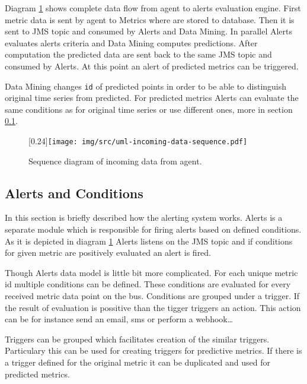     Diagram \ref{img:sequence-incoming-data} shows complete data flow from agent to alerts evaluation engine.
    First metric data is sent by agent to Metrics where are stored to database. Then it is sent to JMS topic
    and consumed by Alerts and Data Mining. In parallel Alerts evaluates alerts criteria and Data Mining computes
    predictions. After computation the predicted data are sent back to the same JMS topic and consumed by Alerts.
    At this point an alert of predicted metrics can be triggered.

    Data Mining changes \texttt{id} of predicted points in order to be able to distinguish original time series from
    predicted. For predicted metrics Alerts can evaluate the same conditions as for original time series or use
    different ones, more in section \ref{sec:alerts-conditions}.

    \begin{figure}[H]
        \begin{center}
            \scalebox{0.33}[0.24]{\texttt{[image: img/src/uml-incoming-data-sequence.pdf]}}
            \caption{Sequence diagram of incoming data from agent.}
            \label{img:sequence-incoming-data}
        \end{center}
    \end{figure}

        \subsection{Alerts and Conditions} \label{sec:alerts-conditions}
        In this section is briefly described how the alerting system works. Alerts is a separate module
        which is responsible for firing alerts based on defined conditions. As it is depicted in diagram
        \ref{img:sequence-incoming-data} Alerts listens on the JMS topic and if conditions for given metric are
        positively evaluated an alert is fired.

        Though Alerts data model is little bit more complicated. For each unique metric id multiple conditions can be
        defined. These conditions are evaluated for every received metric data point on the bus. Conditions are
        grouped under a trigger. If the result of evaluation is possitive than the tigger triggers an action. This
        action can be for instance send an email, sms or perform a webhook\dots

        Triggers can be grouped which facilitates creation of the similar triggers. Particulary this can be used for
        creating triggers for predictive metrics. If there is a trigger defined for the original metric it can be
        duplicated and used for predicted metrics.

